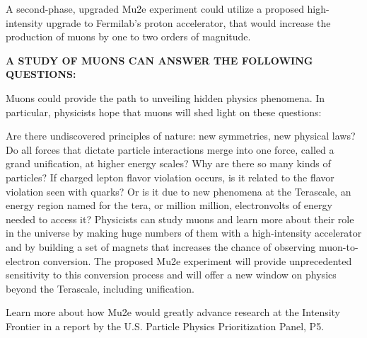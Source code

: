 A second-phase, upgraded Mu2e experiment could utilize a proposed high-intensity upgrade to Fermilab's proton accelerator, that would increase the production of muons by one to two orders of magnitude.

{\bf A STUDY OF MUONS CAN ANSWER THE FOLLOWING QUESTIONS:}

Muons could provide the path to unveiling hidden physics phenomena. In particular, physicists hope that muons will shed light on these questions:

Are there undiscovered principles of nature: new symmetries, new physical laws?
Do all forces that dictate particle interactions merge into one force, called a grand unification, at higher energy scales?
Why are there so many kinds of particles?
If charged lepton flavor violation occurs, is it related to the flavor violation seen with quarks? Or is it due to new phenomena at the Terascale, an energy region named for the tera, or million million, electronvolts of energy needed to access it?
Physicists can study muons and learn more about their role in the universe by making huge numbers of them with a high-intensity accelerator and by building a set of magnets that increases the chance of observing muon-to-electron conversion. The proposed Mu2e experiment will provide unprecedented sensitivity to this conversion process and will offer a new window on physics beyond the Terascale, including unification.

Learn more about how Mu2e would greatly advance research at the Intensity Frontier in a report by the U.S. Particle Physics Prioritization Panel, P5.
